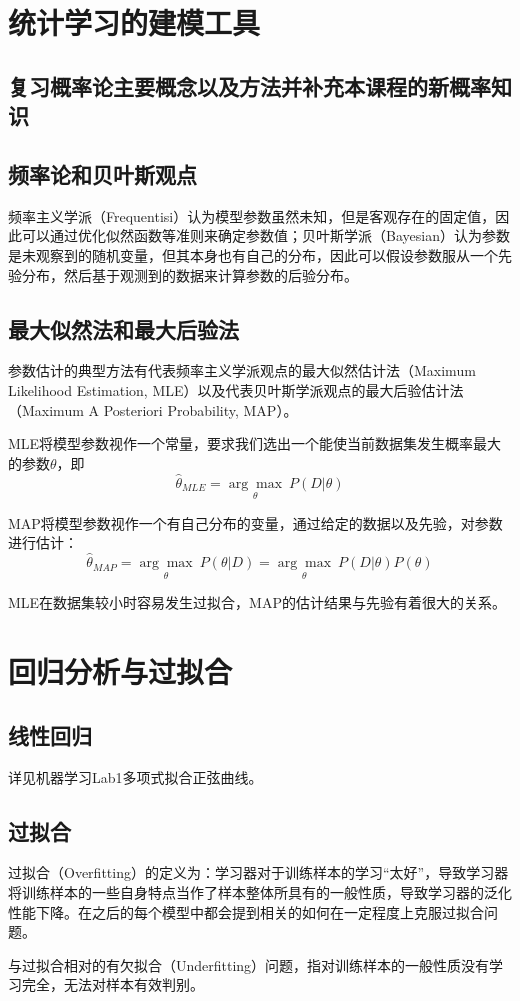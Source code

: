 \documentclass[12pt]{article}
\begin{document}
\section{统计学习的建模工具}
\subsection{复习概率论主要概念以及方法并补充本课程的新概率知识}
\subsection{频率论和贝叶斯观点}
频率主义学派（Frequentisi）认为模型参数虽然未知，但是客观存在的固定值，因此可以通过优化似然函数等准则来确定参数值；贝叶斯学派（Bayesian）认为参数是未观察到的随机变量，但其本身也有自己的分布，因此可以假设参数服从一个先验分布，然后基于观测到的数据来计算参数的后验分布。\par
\subsection{最大似然法和最大后验法}
参数估计的典型方法有代表频率主义学派观点的最大似然估计法（Maximum Likelihood Estimation, MLE）以及代表贝叶斯学派观点的最大后验估计法（Maximum A Posteriori Probability, MAP）。\par
MLE将模型参数视作一个常量，要求我们选出一个能使当前数据集发生概率最大的参数$\theta$，即
\[\hat{\theta}_{MLE}=\underset{\theta}{\arg \max}\ P(D|\theta)\]\par
MAP将模型参数视作一个有自己分布的变量，通过给定的数据以及先验，对参数进行估计：
\[\hat{\theta}_{MAP}=\underset{\theta}{\arg \max}\ P(\theta|D)=\underset{\theta}{\arg \max}\ P(D|\theta)P(\theta)\]\par
MLE在数据集较小时容易发生过拟合，MAP的估计结果与先验有着很大的关系。\par
\section{回归分析与过拟合}
\subsection{线性回归}
详见机器学习Lab1多项式拟合正弦曲线。
\subsection{过拟合}
过拟合（Overfitting）的定义为：学习器对于训练样本的学习“太好”，导致学习器将训练样本的一些自身特点当作了样本整体所具有的一般性质，导致学习器的泛化性能下降。在之后的每个模型中都会提到相关的如何在一定程度上克服过拟合问题。\par
与过拟合相对的有欠拟合（Underfitting）问题，指对训练样本的一般性质没有学习完全，无法对样本有效判别。
\end{document}
